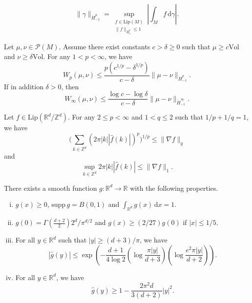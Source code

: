 \documentclass[10pt,a4paper]{amsart}
\begin{document}
\begin{equation}\label{dualsobolevnorm}
\| \gamma \|_{\dot{H}_{-1}^p} = \sup_{\substack{f \in \mathrm{Lip}(M) \\ \| f \|_{\dot{H}_1^q} \le 1}} \left| \int_M f \, \mathrm{d}\gamma \right| .
\end{equation}

\begin{lem}\label{ledouxlemma} Let $\mu, \nu \in \mathcal{P}(M)$. Assume there exist constants $c>\delta \ge 0$ such that $\mu \ge c \mathrm{Vol}$ and $\nu \ge \delta \mathrm{Vol}$. For any $1<p<\infty$, we have
\[ W_p (\mu, \nu) \le \frac{p(c^{1/p} - \delta^{1/p})}{c-\delta} \| \mu - \nu \|_{\dot{H}_{-1}^p} .  \]
If in addition $\delta>0$, then
\[ W_{\infty} (\mu, \nu) \le \frac{\log c - \log \delta}{c-\delta} \| \mu - \nu \|_{\dot{H}_{-1}^{\infty}} . \]
\end{lem}

\begin{lem}\label{torushausdorffyounglemma} Let $f \in \mathrm{Lip}(\mathbb{R}^d / \mathbb{Z}^d)$. For any $2 \le p < \infty$ and $1 < q \le 2$ such that $1/p+1/q=1$, we have
\[ \Bigg( \sum_{k \in \mathbb{Z}^d} (2 \pi |k| |\widehat{f}(k)|)^p \Bigg)^{1/p} \le \| \nabla f \|_q \]
and
\[ \sup_{k \in \mathbb{Z}^d} 2 \pi |k| |\widehat{f}(k)| \le \| \nabla f \|_1 . \]
\end{lem}

\begin{lem}\label{bumpfunctionlemma} There exists a smooth function $g: \mathbb{R}^d \to \mathbb{R}$ with the following properties.
\begin{enumerate}[(i)]
\item $g(x) \ge 0$, $\mathrm{supp} \, g = B(0,1)$ and $\int_{\mathbb{R}^d} g(x) \, \mathrm{d}x=1$.

\item $g(0)=\Gamma \left( \frac{d+2}{2} \right) 2^d /\pi^{d/2}$ and $g(x) \ge (2/27) g(0)$ if $|x|\le 1/5$.

\item For all $y \in \mathbb{R}^d$ such that $|y| \ge (d+3)/\pi$, we have
\[ |\widehat{g}(y)| \le \exp \left( - \frac{d+1}{4 \log 2} \left( \log \frac{\pi |y|}{d+3} \right) \left( \log \frac{e^2 \pi |y|}{d+2} \right) \right) . \]

\item For all $y \in \mathbb{R}^d$, we have
\[ \widehat{g}(y) \ge 1- \frac{2 \pi^2 d}{3(d+2)} |y|^2 . \]
\end{enumerate}
\end{lem}
\end{document}
